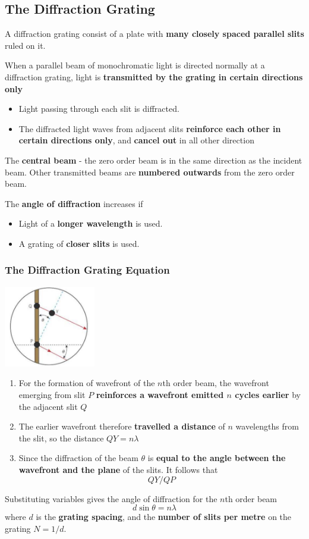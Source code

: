 \subsection{The Diffraction Grating}

A diffraction grating consist of a plate with \textbf{many closely spaced parallel slits} ruled on it.

When a parallel beam of monochromatic light is directed normally at a diffraction grating, light is \textbf{transmitted by the grating in certain directions only}
\begin{itemize}
    \item Light passing through each slit is diffracted.
    \item The diffracted light waves from adjacent slits \textbf{reinforce each other in certain directions only}, and \textbf{cancel out} in all other direction
\end{itemize}

The \textbf{central beam} - the zero order beam is in the same direction as the incident beam. Other transmitted beams are \textbf{numbered outwards} from the zero order beam.

The \textbf{angle of diffraction} increases if
\begin{itemize}
    \item Light of a \textbf{longer wavelength} is used.
    \item A grating of \textbf{closer slits} is used.
\end{itemize}

\subsubsection*{The Diffraction Grating Equation}
\begin{center}
    \includegraphics[width=4cm]{img/grating}
\end{center}

\begin{enumerate}
    \item For the formation of wavefront of the $n$th order beam, the wavefront emerging from slit $P$ \textbf{reinforces a wavefront emitted $n$ cycles earlier} by the adjacent slit $Q$
    \item The earlier wavefront therefore \textbf{travelled a distance} of $n$ wavelengths from the slit, so the distance $QY=n\lambda$
    \item Since the diffraction of the beam $\theta$ is \textbf{equal to the angle between the wavefront and the plane} of the slits. It follows that $$QY/QP$$
\end{enumerate}
Substituting variables gives the angle of diffraction for the $n$th order beam
$$d\sin\theta=n\lambda$$
where $d$ is the \textbf{grating spacing}, and the \textbf{number of slits per metre} on the grating $N=1/d$.


